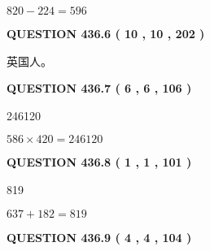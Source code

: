 \documentclass{ctexart}
\begin{document}
 
\noindent{}

$ %
820 -  %
224=   %
596$
 
 
  
\vspace{0.2in}
  
{\textbf{\Large{QUESTION
436.6 
 ( 10 , 10 , 202 )
}}}
  
  
 
 
\noindent{}
 
 
英国人。
 
 
 
 
  
\vspace{0.2in}
  
{\textbf{\Large{QUESTION
436.7 
 ( 6 , 6 , 106 )
}}}
  
  
 
 
\noindent{}

246120
 
 
 
 
\noindent{}

$ %
586 \times  %
420=   %
246120$
 
 
  
\vspace{0.2in}
  
{\textbf{\Large{QUESTION
436.8 
 ( 1 , 1 , 101 )
}}}
  
  
 
 
\noindent{}

819
 
 
 
 
\noindent{}

$ %
637 +  %
182=   %
819$
 
 
  
\vspace{0.2in}
  
{\textbf{\Large{QUESTION
436.9 
 ( 4 , 4 , 104 )
}}}
  
  
 
 
\noindent{}
\end{document}
